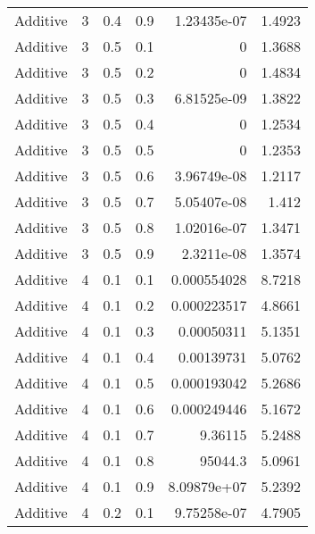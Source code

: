 \documentclass{article}
\begin{document}
\begin{longtable}[H]{lrrrrr}
 Additive       &       3 &   0.4 &            0.9 &      1.23435e-07 &          1.4923 \\
 Additive       &       3 &   0.5 &            0.1 &      0           &          1.3688 \\
 Additive       &       3 &   0.5 &            0.2 &      0           &          1.4834 \\
 Additive       &       3 &   0.5 &            0.3 &      6.81525e-09 &          1.3822 \\
 Additive       &       3 &   0.5 &            0.4 &      0           &          1.2534 \\
 Additive       &       3 &   0.5 &            0.5 &      0           &          1.2353 \\
 Additive       &       3 &   0.5 &            0.6 &      3.96749e-08 &          1.2117 \\
 Additive       &       3 &   0.5 &            0.7 &      5.05407e-08 &          1.412  \\
 Additive       &       3 &   0.5 &            0.8 &      1.02016e-07 &          1.3471 \\
 Additive       &       3 &   0.5 &            0.9 &      2.3211e-08  &          1.3574 \\
 Additive       &       4 &   0.1 &            0.1 &      0.000554028 &          8.7218 \\
 Additive       &       4 &   0.1 &            0.2 &      0.000223517 &          4.8661 \\
 Additive       &       4 &   0.1 &            0.3 &      0.00050311  &          5.1351 \\
 Additive       &       4 &   0.1 &            0.4 &      0.00139731  &          5.0762 \\
 Additive       &       4 &   0.1 &            0.5 &      0.000193042 &          5.2686 \\
 Additive       &       4 &   0.1 &            0.6 &      0.000249446 &          5.1672 \\
 Additive       &       4 &   0.1 &            0.7 &      9.36115     &          5.2488 \\
 Additive       &       4 &   0.1 &            0.8 &  95044.3         &          5.0961 \\
 Additive       &       4 &   0.1 &            0.9 &      8.09879e+07 &          5.2392 \\
 Additive       &       4 &   0.2 &            0.1 &      9.75258e-07 &          4.7905 \\

\end{longtable}
\end{document}

